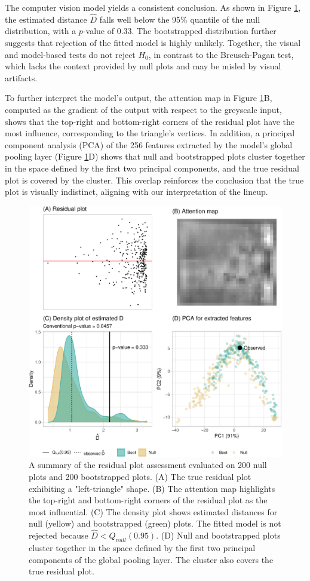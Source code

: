 \documentclass[]{interact}
\theoremstyle{plain}%
\theoremstyle{definition}
\theoremstyle{remark}
\begin{document}
The computer vision model yields a consistent conclusion. As shown in
Figure \ref{fig:false-check}, the estimated distance \(\hat{D}\) falls
well below the 95\% quantile of the null distribution, with a
\(p\)-value of \(0.33\). The bootstrapped distribution further suggests
that rejection of the fitted model is highly unlikely. Together, the
visual and model-based tests do not reject \(H_0\), in contrast to the
Breusch-Pagan test, which lacks the context provided by null plots and
may be misled by visual artifacts.

To further interpret the model's output, the attention map in Figure
\ref{fig:false-check}B, computed as the gradient of the output with
respect to the greyscale input, shows that the top-right and
bottom-right corners of the residual plot have the most influence,
corresponding to the triangle's vertices. In addition, a principal
component analysis (PCA) of the 256 features extracted by the model's
global pooling layer (Figure \ref{fig:false-check}D) shows that null and
bootstrapped plots cluster together in the space defined by the first
two principal components, and the true residual plot is covered by the
cluster. This overlap reinforces the conclusion that the true plot is
visually indistinct, aligning with our interpretation of the lineup.

\begin{figure}[!h]

{\centering \includegraphics[width=0.8\linewidth]{paper_files/figure-latex/false-check-1} 

}

\caption{A summary of the residual plot assessment evaluated on 200 null plots and 200 bootstrapped plots. (A) The true residual plot exhibiting a "left-triangle" shape. (B) The attention map highlights the top-right and bottom-right corners of the residual plot as the most influential.  (C) The density plot shows estimated distances for null (yellow) and bootstrapped (green) plots. The fitted model is not rejected because $\hat{D} < Q_{null}(0.95)$. (D) Null and bootstrapped plots cluster together in the space defined by the first two principal components of the global pooling layer. The cluster also covers the true residual plot.}\label{fig:false-check}
\end{figure}
\end{document}
